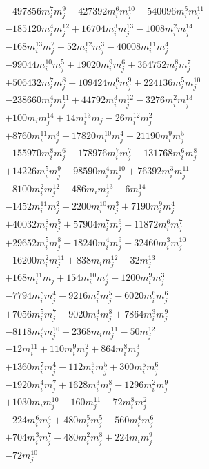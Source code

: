 {\begin{align*}
&-497856m_i^{7}m_j^{9}-427392m_i^{6}m_j^{10}+540096m_i^{5}m_j^{11}\\
&-185120m_i^{4}m_j^{12}+16704m_i^{3}m_j^{13}-1008m_i^{2}m_j^{14}\\
&-168m_i^{13}m_j^{2}+52m_i^{12}m_j^{3}-40008m_i^{11}m_j^{4}\\
&-99044m_i^{10}m_j^{5}+19020m_i^{9}m_j^{6}+364752m_i^{8}m_j^{7}\\
&+506432m_i^{7}m_j^{8}+109424m_i^{6}m_j^{9}+224136m_i^{5}m_j^{10}\\
&-238660m_i^{4}m_j^{11}+44792m_i^{3}m_j^{12}-3276m_i^{2}m_j^{13}\\
&+100m_im_j^{14}+14m_i^{13}m_j-26m_i^{12}m_j^{2}\\
&+8760m_i^{11}m_j^{3}+17820m_i^{10}m_j^{4}-21190m_i^{9}m_j^{5}\\
&-155970m_i^{8}m_j^{6}-178976m_i^{7}m_j^{7}-131768m_i^{6}m_j^{8}\\
&+14226m_i^{5}m_j^{9}-98590m_i^{4}m_j^{10}+76392m_i^{3}m_j^{11}\\
&-8100m_i^{2}m_j^{12}+486m_im_j^{13}-6m_j^{14}\\
&-1452m_i^{11}m_j^{2}-2200m_i^{10}m_j^{3}+7190m_i^{9}m_j^{4}\\
&+40032m_i^{8}m_j^{5}+57904m_i^{7}m_j^{6}+11872m_i^{6}m_j^{7}\\
&+29652m_i^{5}m_j^{8}-18240m_i^{4}m_j^{9}+32460m_i^{3}m_j^{10}\\
&-16200m_i^{2}m_j^{11}+838m_im_j^{12}-32m_j^{13}\\
&+168m_i^{11}m_j+154m_i^{10}m_j^{2}-1200m_i^{9}m_j^{3}\\
&-7794m_i^{8}m_j^{4}-9216m_i^{7}m_j^{5}-6020m_i^{6}m_j^{6}\\
&+7056m_i^{5}m_j^{7}-9020m_i^{4}m_j^{8}+7864m_i^{3}m_j^{9}\\
&-8118m_i^{2}m_j^{10}+2368m_im_j^{11}-50m_j^{12}\\
&-12m_i^{11}+110m_i^{9}m_j^{2}+864m_i^{8}m_j^{3}\\
&+1360m_i^{7}m_j^{4}-112m_i^{6}m_j^{5}+300m_i^{5}m_j^{6}\\
&-1920m_i^{4}m_j^{7}+1628m_i^{3}m_j^{8}-1296m_i^{2}m_j^{9}\\
&+1030m_im_j^{10}-160m_j^{11}-72m_i^{8}m_j^{2}\\
&-224m_i^{6}m_j^{4}+480m_i^{5}m_j^{5}-560m_i^{4}m_j^{6}\\
&+704m_i^{3}m_j^{7}-480m_i^{2}m_j^{8}+224m_im_j^{9}\\
&-72m_j^{10}
\end{align*}
}

